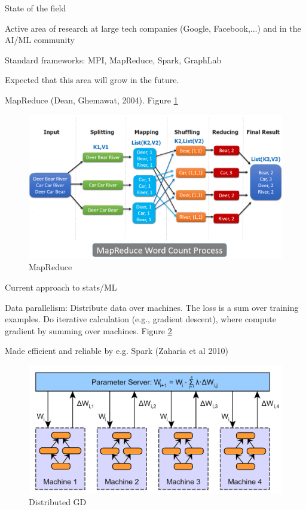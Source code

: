 \documentclass[english]{article}
\begin{document}
\item {State of the field}
\bitem
\item Active area of research at large tech companies (Google, Facebook,...) and in the AI/ML community
\item Standard frameworks: MPI, MapReduce, Spark, GraphLab
\item Expected that this area will grow in the future. 
\eitem



\item {MapReduce (Dean, Ghemawat, 2004)}. Figure \ref{mr}
\begin{figure}
\begin{center}
\includegraphics[width=0.5\paperwidth]{mapred}
    \caption{MapReduce}
    \label{mr}
\end{center}
\end{figure}




\item {Current approach to stats/ML}
\bitem
\item Data parallelism: Distribute data over machines. The loss is a sum over training examples. Do iterative calculation (e.g., gradient descent), where compute gradient by summing over machines. Figure \ref{dgd}
\item Made efficient and reliable by e.g. Spark (Zaharia et al 2010) 
\eitem
\begin{figure}
\begin{center}
\includegraphics[width=0.5\paperwidth]{image5}
    \caption{Distributed GD}
    \label{dgd}
\end{center}
\end{figure}
\end{document}
